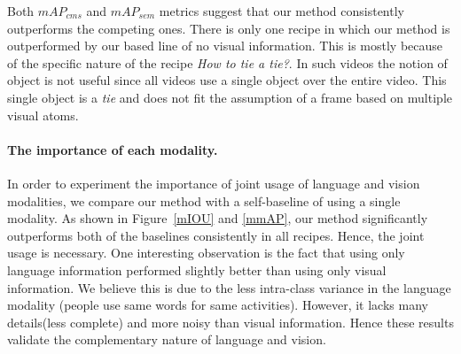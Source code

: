 \begin{table}
\caption{Semantic mean-average-precision $mAP_{sem}$.}
{\small
{}}
\normalsize
\end{table}

Both $mAP_{cms}$ and $mAP_{sem}$ metrics suggest that our method consistently outperforms the competing ones. There is only one recipe in which our method is outperformed by our based line of no visual information. This is mostly because of the specific nature of the recipe \emph{How to tie a tie?}. In such videos the notion of object is not useful since all videos use a single object over the entire video. This single object is a \emph{tie} and does not fit the assumption of a frame based on multiple visual atoms. 


\paragraph{The importance of each modality.}
In order to experiment the importance of joint usage of language and vision modalities, we compare our method with a self-baseline of using a single modality. As shown in Figure~\ref{mIOU} and \ref{mmAP}, our method significantly outperforms both of the baselines consistently in all recipes. Hence, the joint usage is necessary. One interesting observation is the fact that using only language information performed slightly better than using only visual information. We believe this is due to the less intra-class variance in the language modality (\ie people use same words for same activities). However, it lacks many details(less complete) and more noisy than visual information. Hence these results validate the complementary nature of language and vision.